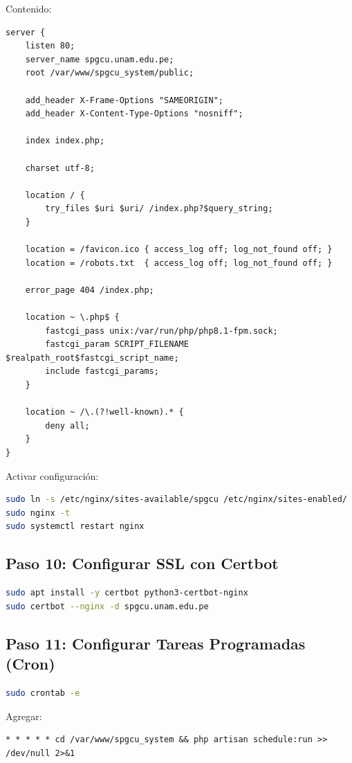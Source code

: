 \documentclass[12pt,a4paper]{article}
\begin{document}
Contenido:
\begin{lstlisting}
server {
    listen 80;
    server_name spgcu.unam.edu.pe;
    root /var/www/spgcu_system/public;

    add_header X-Frame-Options "SAMEORIGIN";
    add_header X-Content-Type-Options "nosniff";

    index index.php;

    charset utf-8;

    location / {
        try_files $uri $uri/ /index.php?$query_string;
    }

    location = /favicon.ico { access_log off; log_not_found off; }
    location = /robots.txt  { access_log off; log_not_found off; }

    error_page 404 /index.php;

    location ~ \.php$ {
        fastcgi_pass unix:/var/run/php/php8.1-fpm.sock;
        fastcgi_param SCRIPT_FILENAME $realpath_root$fastcgi_script_name;
        include fastcgi_params;
    }

    location ~ /\.(?!well-known).* {
        deny all;
    }
}
\end{lstlisting}

Activar configuración:
\begin{lstlisting}[language=bash]
sudo ln -s /etc/nginx/sites-available/spgcu /etc/nginx/sites-enabled/
sudo nginx -t
sudo systemctl restart nginx
\end{lstlisting}

\subsection{Paso 10: Configurar SSL con Certbot}
\begin{lstlisting}[language=bash]
sudo apt install -y certbot python3-certbot-nginx
sudo certbot --nginx -d spgcu.unam.edu.pe
\end{lstlisting}

\subsection{Paso 11: Configurar Tareas Programadas (Cron)}
\begin{lstlisting}[language=bash]
sudo crontab -e
\end{lstlisting}

Agregar:
\begin{lstlisting}
* * * * * cd /var/www/spgcu_system && php artisan schedule:run >> /dev/null 2>&1
\end{lstlisting}
\end{document}
